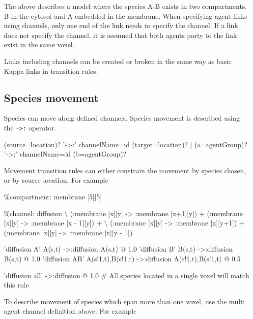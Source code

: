 The above describes a model where the species A-B exists in two compartments, B in the cytosol and A embedded in the membrane. When specifying agent links using channels, only one end of the link needs to specify the channel. If a link does not specify the channel, it is assumed that both agents party to the link exist in the same voxel.

Links including channels can be created or broken in the same way as basic Kappa links in transition rules.

\subsection{Species movement}

Species can move along defined channels. Species movement is described using the \verb|->:| operator.
\begin{bnfsource}
(source=location)? '->:' channelName=id (target=location)?
| (a=agentGroup)? '->:' channelName=id (b=agentGroup)?
\end{bnfsource}

Movement transition rules can either constrain the movement by species chosen, or by source location. For example

\begin{kappasource}
\%compartment: membrane [5][5]

\%channel: diffusion {\textbackslash}
    (:membrane [x][y] -> :membrane [x+1][y]) + (:membrane [x][y] -> :membrane [x - 1][y]) + {\textbackslash}
    (:membrane [x][y] -> :membrane [x][y+1]) + (:membrane [x][y] -> :membrane [x][y - 1])

'diffusion A' A(s,t) ->:diffusion A(s,t) @ 1.0
'diffusion B' B(s,t) ->:diffusion B(s,t) @ 1.0
'diffusion AB' A(s!1,t),B(s!1,t) ->:diffusion A(s!1,t),B(s!1,t) @ 0.5

'diffusion all' ->:diffusion @ 1.0 # All species located in a single voxel will match this rule
\end{kappasource}

To describe movement of species which span more than one voxel, use the multi agent channel definition above. For example

